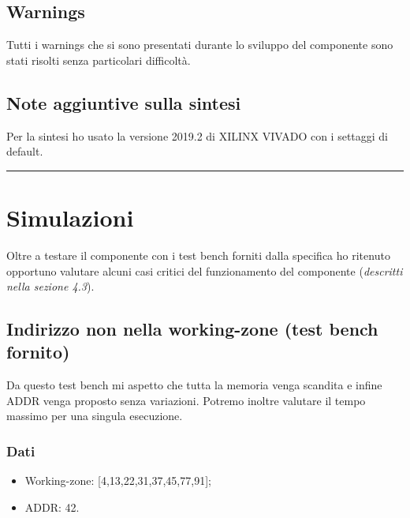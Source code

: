 \documentclass{article}
\begin{document}
\subsection{Warnings}
Tutti i warnings che si sono presentati durante lo sviluppo del componente sono stati risolti senza particolari difficoltà.
\subsection{Note aggiuntive sulla sintesi}
Per la sintesi ho usato la versione 2019.2 di XILINX VIVADO con i settaggi di default.

\noindent\rule{\textwidth}{0.5pt}
\newpage
\section{Simulazioni}
Oltre a testare il componente con i test bench forniti dalla specifica ho ritenuto opportuno valutare alcuni casi critici del funzionamento del componente (\textit{descritti nella sezione 4.3}).
\subsection{Indirizzo non nella working-zone (test bench fornito)}
Da questo test bench mi aspetto che tutta la memoria venga scandita e infine ADDR venga proposto senza variazioni.
Potremo inoltre valutare il tempo massimo per una singula esecuzione.
\subsubsection{Dati}
\begin{itemize}
	\item Working-zone: [4,13,22,31,37,45,77,91];
	\item ADDR: 42.
\end{itemize}
\end{document}
